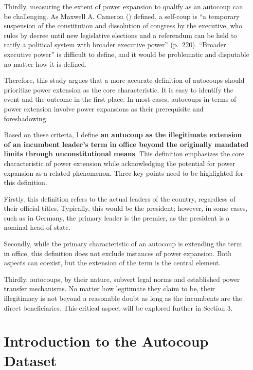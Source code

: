 \documentclass[
  12pt,
]{report}
\begin{document}
Thirdly, measuring the extent of power expansion to qualify as an
autocoup can be challenging. As Maxwell A. Cameron
() defined, a self-coup is ``a
temporary suspension of the constitution and dissolution of congress by
the executive, who rules by decree until new legislative elections and a
referendum can be held to ratify a political system with broader
executive power'' (p.~220). ``Broader executive power'' is difficult to
define, and it would be problematic and disputable no matter how it is
defined.

Therefore, this study argues that a more accurate definition of
autocoups should prioritize power extension as the core characteristic.
It is easy to identify the event and the outcome in the first place. In
most cases, autocoups in terms of power extension involve power
expansions as their prerequisite and foreshadowing.

Based on these criteria, I define \textbf{an autocoup as the
illegitimate extension of an incumbent leader's term in office beyond
the originally mandated limits through unconstitutional means}. This
definition emphasizes the core characteristic of power extension while
acknowledging the potential for power expansion as a related phenomenon.
Three key points need to be highlighted for this definition.

Firstly, this definition refers to the actual leaders of the country,
regardless of their official titles. Typically, this would be the
president; however, in some cases, such as in Germany, the primary
leader is the premier, as the president is a nominal head of state.

Secondly, while the primary characteristic of an autocoup is extending
the term in office, this definition does not exclude instances of power
expansion. Both aspects can coexist, but the extension of the term is
the central element.

Thirdly, autocoups, by their nature, subvert legal norms and established
power transfer mechanisms. No matter how legitimate they claim to be,
their illegitimacy is not beyond a reasonable doubt as long as the
incumbents are the direct beneficiaries. This critical aspect will be
explored further in Section 3.

\section{Introduction to the Autocoup
Dataset}\label{introduction-to-the-autocoup-dataset}
\end{document}
